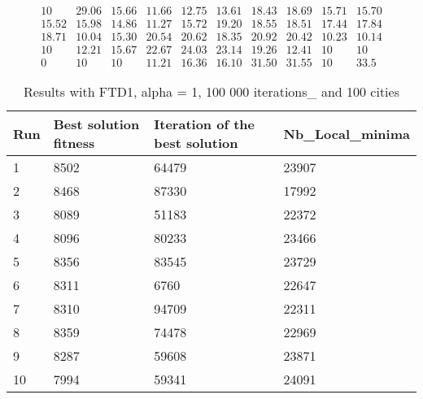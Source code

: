 \documentclass[12pt,oneside,a4paper]{article}
\begin{document}
\begin{equation}
  \tag{Mean Tabu Duration for each city (alpha = 5 and 50 cities)}
  \begin{smallmatrix} 10 & 29.06 & 15.66 & 11.66 & 12.75 & 13.61 & 18.43 & 18.69 & 15.71 & 15.70 \\
    15.52 & 15.98 & 14.86 & 11.27 & 15.72 & 19.20 & 18.55 & 18.51 & 17.44 & 17.84 \\
    18.71 & 10.04 & 15.30 & 20.54 & 20.62 & 18.35 & 20.92 & 20.42 & 10.23 & 10.14 \\
    10 & 12.21 & 15.67 & 22.67 & 24.03 & 23.14 & 19.26 & 12.41 & 10 & 10 \\
    0 & 10 & 10 & 11.21 & 16.36 & 16.10 & 31.50 & 31.55 & 10 & 33.5
  \end{smallmatrix}
\end{equation}

\begin{table}[h]
  \centering
  \small
  \begin{tabular}{llll}
    \hline
    \multicolumn{1}{|l|}{\textbf{Run}}& \multicolumn{1}{l|}{\textbf{Best solution fitness}}& \multicolumn{1}{l|}{\textbf{Iteration of the best solution}}& \multicolumn{1}{l|}{\textbf{Nb\_Local\_minima}}\\ \hline
    \multicolumn{1}{|l|}{1} & \multicolumn{1}{l|}{8502}  & \multicolumn{1}{l|}{64479} & \multicolumn{1}{l|}{23907}  \\ \hline
    \multicolumn{1}{|l|}{2} & \multicolumn{1}{l|}{8468}  & \multicolumn{1}{l|}{87330} & \multicolumn{1}{l|}{17992}  \\ \hline
    \multicolumn{1}{|l|}{3} & \multicolumn{1}{l|}{8089}  & \multicolumn{1}{l|}{51183}  & \multicolumn{1}{l|}{22372}  \\ \hline
    \multicolumn{1}{|l|}{4} & \multicolumn{1}{l|}{8096}  & \multicolumn{1}{l|}{80233}  & \multicolumn{1}{l|}{23466}  \\ \hline
    \multicolumn{1}{|l|}{5} & \multicolumn{1}{l|}{8356}  & \multicolumn{1}{l|}{83545}  & \multicolumn{1}{l|}{23729}  \\ \hline
    \multicolumn{1}{|l|}{6} & \multicolumn{1}{l|}{8311}  & \multicolumn{1}{l|}{6760}  & \multicolumn{1}{l|}{22647}  \\ \hline
    \multicolumn{1}{|l|}{7} & \multicolumn{1}{l|}{8310}  & \multicolumn{1}{l|}{94709}  & \multicolumn{1}{l|}{22311}  \\ \hline
    \multicolumn{1}{|l|}{8} & \multicolumn{1}{l|}{8359}  & \multicolumn{1}{l|}{74478} & \multicolumn{1}{l|}{22969}  \\ \hline
    \multicolumn{1}{|l|}{9} & \multicolumn{1}{l|}{8287}  & \multicolumn{1}{l|}{59608} & \multicolumn{1}{l|}{23871}  \\ \hline
    \multicolumn{1}{|l|}{10} & \multicolumn{1}{l|}{7994}  & \multicolumn{1}{l|}{59341} & \multicolumn{1}{l|}{24091}  \\ \hline
  \end{tabular}
  \caption{Results with FTD1, alpha = 1, 100 000 iterations\_ and 100 cities}
\end{table}
\end{document}
